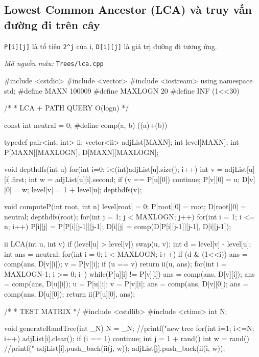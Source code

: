 \documentclass[11pt]{article}
\newcommand{\codepath}[1]{\par\noindent\textit{Mã nguồn mẫu:} \texttt{#1}\par}
\begin{document}
\subsection{Lowest Common Ancestor (LCA) và truy vấn đường đi trên cây}

\texttt{P[i][j]} là tổ tiên \texttt{2\textasciicircum{}j} của i, \texttt{D[i][j]} là giá trị đường đi tương ứng.

\codepath{Trees/lca.cpp}

\begingroup\scriptsize
\begin{vncode}
#include <cstdio>
#include <vector>
#include <iostream>
using namespace std;
#define MAXN 100009
#define MAXLOGN 20
#define INF (1<<30)

/*
 * LCA + PATH QUERY O(logn)
 */

const int neutral = 0;
#define comp(a, b) ((a)+(b))

typedef pair<int, int> ii;
vector<ii> adjList[MAXN];
int level[MAXN];
int P[MAXN][MAXLOGN], D[MAXN][MAXLOGN];

void depthdfs(int u) {
	for(int i=0; i<(int)adjList[u].size(); i++) {
		int v = adjList[u][i].first;
		int w = adjList[u][i].second;
		if (v == P[u][0]) continue;
		P[v][0] = u; D[v][0] = w;
		level[v] = 1 + level[u];
		depthdfs(v);
	}
}

void computeP(int root, int n) {
	level[root] = 0;
	P[root][0] = root; D[root][0] = neutral;
	depthdfs(root);
	for(int j = 1; j < MAXLOGN; j++)
		for(int i = 1; i <= n; i++) {
			P[i][j] = P[P[i][j-1]][j-1];
			D[i][j] = comp(D[P[i][j-1]][j-1], D[i][j-1]);
		}
}

ii LCA(int u, int v) {
	if (level[u] > level[v]) swap(u, v);
	int d = level[v] - level[u];
	int ans = neutral;
	for(int i = 0; i < MAXLOGN; i++) {
		if (d & (1<<i)) {
			ans = comp(ans, D[v][i]);
			v = P[v][i];
		}
	}
	if (u == v) return ii(u, ans);
	for(int i = MAXLOGN-1; i >= 0; i--)
		while(P[u][i] != P[v][i]) {
			ans = comp(ans, D[v][i]);
			ans = comp(ans, D[u][i]);
			u = P[u][i]; v = P[v][i];
		}
	ans = comp(ans, D[v][0]);
	ans = comp(ans, D[u][0]);
	return ii(P[u][0], ans);
}

/*
 * TEST MATRIX
 */
#include <cstdlib>
#include <ctime>
int N;

void generateRandTree(int _N) {
	N = _N;
	//printf("new tree %
	for(int i=1; i<=N; i++) {
		adjList[i].clear();
		if (i == 1) continue;
		int j = 1 + rand()%
		int w = rand()%
		//printf("%
		adjList[i].push_back(ii(j, w));
		adjList[j].push_back(ii(i, w));
	}
}


\end{vncode}
\end{document}
